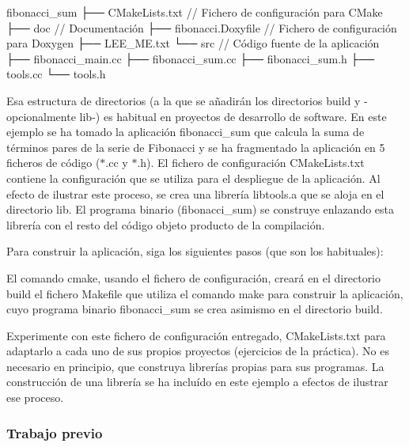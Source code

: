 \begin{DoxyCode}
fibonacci\_sum
├── CMakeLists.txt             // Fichero de configuración para CMake
├── doc                        // Documentación
├── fibonacci.Doxyfile         // Fichero de configuración para Doxygen
├── LEE\_ME.txt
└── src                        // Código fuente de la aplicación
    ├── fibonacci\_main.cc
    ├── fibonacci\_sum.cc
    ├── fibonacci\_sum.h
    ├── tools.cc
    └── tools.h
\end{DoxyCode}
 Esa estructura de directorios (a la que se añadirán los directorios {\ttfamily build} y -\/opcionalmente {\ttfamily lib}-\/) es habitual en proyectos de desarrollo de software. En este ejemplo se ha tomado la aplicación {\ttfamily fibonacci\+\_\+sum} que calcula la suma de términos pares de la serie de Fibonacci y se ha fragmentado la aplicación en 5 ficheros de código ({\ttfamily $\ast$.cc} y {\ttfamily $\ast$.h}). El fichero de configuración {\ttfamily C\+Make\+Lists.\+txt} contiene la configuración que se utiliza para el despliegue de la aplicación. Al efecto de ilustrar este proceso, se crea una librería {\ttfamily libtools.\+a} que se aloja en el directorio {\ttfamily lib}. El programa binario ({\ttfamily fibonacci\+\_\+sum}) se construye enlazando esta librería con el resto del código objeto producto de la compilación.

Para construir la aplicación, siga los siguientes pasos (que son los habituales)\+: 


El comando {\ttfamily cmake}, usando el fichero de configuración, creará en el directorio {\ttfamily build} el fichero {\ttfamily Makefile} que utiliza el comando {\ttfamily make} para construir la aplicación, cuyo programa binario {\ttfamily fibonacci\+\_\+sum} se crea asimismo en el directorio {\ttfamily build}.

Experimente con este fichero de configuración entregado, {\ttfamily C\+Make\+Lists.\+txt} para adaptarlo a cada uno de sus propios proyectos (ejercicios de la práctica). No es necesario en principio, que construya librerías propias para sus programas. La construcción de una librería se ha incluído en este ejemplo a efectos de ilustrar ese proceso.

\subsubsection*{Trabajo previo}


